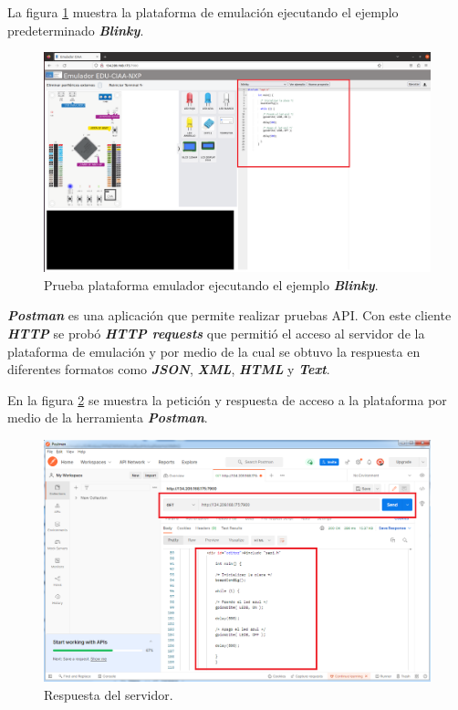 La figura \ref{fig:PlataformaEmuladorBlinky} muestra la plataforma de emulación ejecutando el ejemplo predeterminado \textit{\textbf{Blinky}}.

\begin{figure}[ht]
	\centering
	\includegraphics[scale=.28]{./Figures/PlataformaEmuladorBlinky.png}
	\caption{Prueba plataforma emulador ejecutando el ejemplo \textit{\textbf{Blinky}}.}
	\label{fig:PlataformaEmuladorBlinky}
\end{figure}

\textit{\textbf{Postman}} es una aplicación que permite realizar pruebas API. Con este cliente \textit{\textbf{HTTP}} se probó \textit{\textbf{HTTP requests}} que permitió el acceso al servidor de la plataforma de emulación y por medio de la cual se obtuvo la respuesta en diferentes formatos como  \textit{\textbf{JSON}}, \textit{\textbf{XML}}, \textit{\textbf{HTML}} y \textit{\textbf{Text}}.


En la figura \ref{fig:PostmanBlinky2} se muestra la petición y respuesta de acceso a la plataforma por medio de la herramienta \textit{\textbf{Postman}}.

\hfill \break
\hfill \break
\hfill \break
\hfill \break
\hfill \break
\hfill \break
\hfill \break

\begin{figure}[ht]
	\centering
	\includegraphics[scale=.37]{./Figures/PostmanBlinky2.png}
	\caption{Respuesta del servidor.}
	\label{fig:PostmanBlinky2}
\end{figure}



